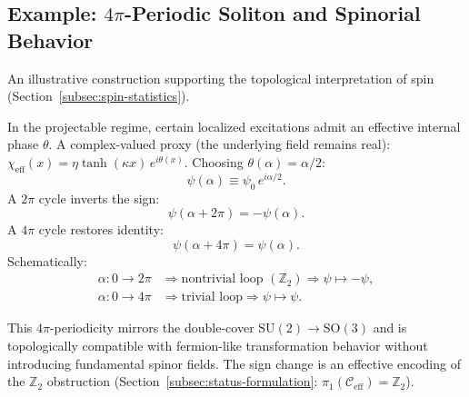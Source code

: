 \subsection{Example:
\texorpdfstring{$4\pi$}{4π}-Periodic Soliton and Spinorial
Behavior}
  \label{subsec:4pi_soliton}

  An illustrative construction supporting the topological interpretation
  of spin
  (Section~\ref{subsec:spin-statistics}).

  In the projectable regime, certain localized excitations admit an
  effective internal phase $\theta$.
  A complex-valued proxy (the underlying field remains real):
  $\chi_{\mathrm{eff}}(x)
  = \eta\tanh(\kappa x)\,e^{i\theta(x)}$.
  Choosing $\theta(\alpha) = \alpha/2$:
  \begin{equation}
    \psi(\alpha)
    \equiv \psi_0\,e^{i\alpha/2}.
    \label{eq:B4-half-angle-map}
  \end{equation}
  A $2\pi$ cycle inverts the sign:
  \begin{equation}
    \psi(\alpha + 2\pi) = -\psi(\alpha).
    \label{eq:B4-2pi-sign}
  \end{equation}
  A $4\pi$ cycle restores identity:
  \begin{equation}
    \psi(\alpha + 4\pi) = \psi(\alpha).
    \label{eq:B4-4pi-identity}
  \end{equation}
  Schematically:
  \begin{equation}
    \begin{aligned}
      \alpha: 0 \to 2\pi
      &\Rightarrow \text{nontrivial loop }
      (\mathbb{Z}_2)
      \Rightarrow \psi \mapsto -\psi, \\
      \alpha: 0 \to 4\pi
      &\Rightarrow \text{trivial loop}
      \Rightarrow \psi \mapsto \psi.
    \end{aligned}
    \label{eq:B4-schematic-doublecover}
  \end{equation}

  This $4\pi$-periodicity mirrors the double-cover
  $\mathrm{SU}(2) \to \mathrm{SO}(3)$ and is topologically compatible
  with fermion-like transformation behavior without introducing
  fundamental spinor fields.
  The sign change is an effective encoding of the $\mathbb{Z}_2$ obstruction (Section~\ref{subsec:status-formulation}:
  $\pi_1(\mathcal{C}_{\mathrm{eff}}) = \mathbb{Z}_2$).
